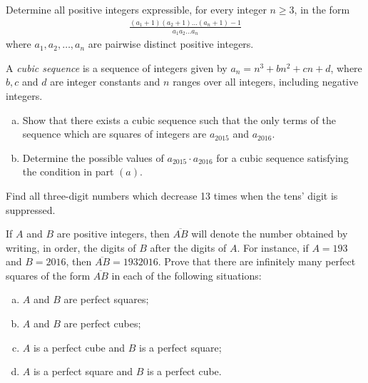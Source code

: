 \documentclass[problems.tex]{subfile}
\begin{document}
	\begin{problem}
		Determine all positive integers expressible, for every integer $n \geq 3$,
		in the form
			\begin{align*}
				\frac{(a_1 + 1)(a_2 + 1) \dots (a_n + 1) - 1}{a_1a_2\dots a_n}
			\end{align*}
		where $a_1, a_2, \dots, a_n$ are pairwise distinct positive integers.
	\end{problem}



	\begin{problem}
		A \textit{cubic sequence} is a sequence of integers given by $a_n =n^3 + bn^2 + cn + d$, where $b, c$ and $d$ are integer constants and $n$ ranges over all integers, including negative integers.
		\begin{enumerate}[(a)]
			\item Show that there exists a cubic sequence such that the only terms
			of the sequence which are squares of integers are $a_{2015}$ and $a_{2016}$.
			\item Determine the possible values of $a_{2015} \cdot a_{2016}$ for a cubic sequence
			satisfying the condition in part $(a)$.
		\end{enumerate}
	\end{problem}


	\begin{problem}
		Find all three-digit numbers which decrease 13 times when the tens'	digit is suppressed.
	\end{problem}


	\begin{problem}
		If $A$ and $B$ are positive integers, then $\overline{AB}$ will denote the number obtained by writing, in order, the digits of $B$ after the digits of $A$. For instance, if $A = 193$ and $B = 2016$, then $\overline{AB} = 1932016$.
		Prove that there are infinitely many perfect squares of the form $\overline{AB}$ in each of the following situations:
		\begin{enumerate}[(a)]
			\item $A$ and $B$ are perfect squares;
			\item $A$ and $B$ are perfect cubes;
			\item $A$ is a perfect cube and $B$ is a perfect square;
			\item $A$ is a perfect square and $B$ is a perfect cube.
		\end{enumerate}
	\end{problem}
\end{document}
